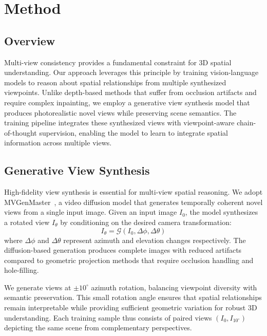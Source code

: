\section{Method}
\label{sec:methods}

\subsection{Overview}

Multi-view consistency provides a fundamental constraint for 3D spatial understanding. Our approach leverages this principle by training vision-language models to reason about spatial relationships from multiple synthesized viewpoints. Unlike depth-based methods that suffer from occlusion artifacts and require complex inpainting, we employ a generative view synthesis model that produces photorealistic novel views while preserving scene semantics. The training pipeline integrates these synthesized views with viewpoint-aware chain-of-thought supervision, enabling the model to learn to integrate spatial information across multiple views.

\subsection{Generative View Synthesis}

High-fidelity view synthesis is essential for multi-view spatial reasoning. We adopt MVGenMaster~\cite{ren2025mvgenmaster}, a video diffusion model that generates temporally coherent novel views from a single input image. Given an input image $I_0$, the model synthesizes a rotated view $I_\theta$ by conditioning on the desired camera transformation:
\begin{equation}
I_\theta = \mathcal{G}(I_0, \Delta\phi, \Delta\theta)
\end{equation}
where $\Delta\phi$ and $\Delta\theta$ represent azimuth and elevation changes respectively. The diffusion-based generation produces complete images with reduced artifacts compared to geometric projection methods that require occlusion handling and hole-filling.

We generate views at $\pm 10^\circ$ azimuth rotation, balancing viewpoint diversity with semantic preservation. This small rotation angle ensures that spatial relationships remain interpretable while providing sufficient geometric variation for robust 3D understanding. Each training sample thus consists of paired views $(I_0, I_{10^\circ})$ depicting the same scene from complementary perspectives.

